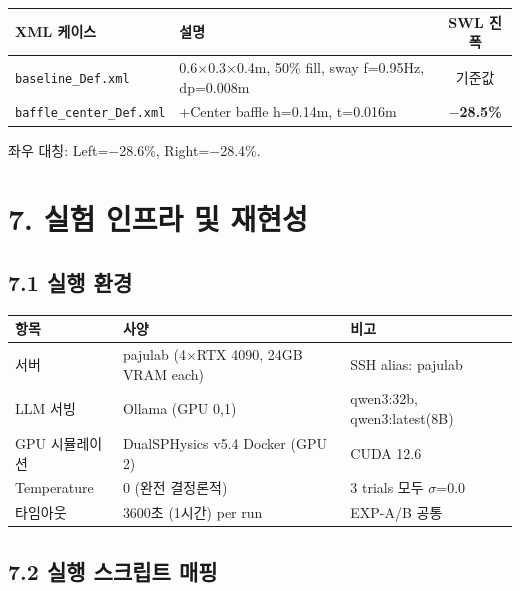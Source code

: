 \documentclass[10pt,a4paper]{article}
\begin{document}
\begin{center}
\small
\begin{tabular}{lp{6cm}c}
\toprule
\textbf{XML 케이스} & \textbf{설명} & \textbf{SWL 진폭} \\
\midrule
\texttt{baseline\_Def.xml} & 0.6$\times$0.3$\times$0.4m, 50\% fill, sway f=0.95Hz, dp=0.008m & 기준값 \\
\texttt{baffle\_center\_Def.xml} & +Center baffle h=0.14m, t=0.016m & \textbf{$-$28.5\%} \\
\bottomrule
\end{tabular}
\end{center}

좌우 대칭: Left=$-$28.6\%, Right=$-$28.4\%.

\section{7. 실험 인프라 및 재현성}

\subsection{7.1 실행 환경}

\begin{center}
\small
\begin{tabular}{lll}
\toprule
\textbf{항목} & \textbf{사양} & \textbf{비고} \\
\midrule
서버 & pajulab (4$\times$RTX 4090, 24GB VRAM each) & SSH alias: pajulab \\
LLM 서빙 & Ollama (GPU 0,1) & qwen3:32b, qwen3:latest(8B) \\
GPU 시뮬레이션 & DualSPHysics v5.4 Docker (GPU 2) & CUDA 12.6 \\
Temperature & 0 (완전 결정론적) & 3 trials 모두 $\sigma$=0.0 \\
타임아웃 & 3600초 (1시간) per run & EXP-A/B 공통 \\
\bottomrule
\end{tabular}
\end{center}

\subsection{7.2 실행 스크립트 매핑}
\end{document}
